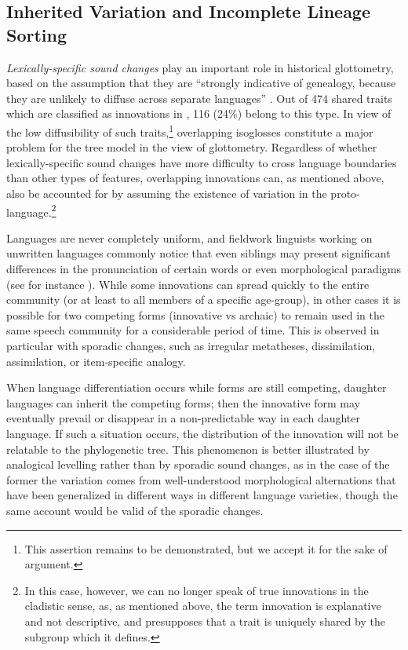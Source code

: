 \documentclass[svgnames,12pt]{scrartcl}
\begin{document}
{{\subsection{Inherited Variation and Incomplete Lineage Sorting}
\textit{Lexically-specific sound changes} play an important role in historical glottometry, based on
the assumption that
they are ``strongly indicative of genealogy, because they are unlikely to diffuse across separate
languages'' \citet[178]{Francois2015}. Out of 474 shared traits which are classified as innovations in \citet{Francois2015}, 116 (24\%) belong to this type. In view of the low
diffusibility of such traits,\footnote{This assertion remains to be demonstrated, but we
accept it for the sake of argument.} overlapping isoglosses constitute a major problem
for the tree model in the view of glottometry. Regardless of whether lexically-specific sound changes have more difficulty to
cross language boundaries than other types of features, overlapping innovations can, as mentioned
above, also be accounted for by assuming the existence of variation in the
proto-language.\footnote{In this case, however, we can no longer speak of true innovations in the cladistic
sense, as, as mentioned above, the term innovation is explanative and not descriptive, and
presupposes that a trait is uniquely shared by the subgroup which it defines.}

Languages are never completely uniform, and fieldwork linguists working on unwritten languages
commonly notice that even siblings may present significant differences in the pronunciation of
certain words or even morphological paradigms (see for instance \citealt[29-30]{genetti07grammar}).
While some innovations can spread quickly to the entire community (or at least to all members of a
specific age-group), in other cases it is possible for two competing forms (innovative vs archaic)
to remain used in the same  speech community for a considerable period of time. This is observed in
particular with sporadic changes, such as irregular metatheses, dissimilation, assimilation, or
item-specific analogy.

When language differentiation occurs while forms are still competing, daughter languages can inherit
the competing forms; then the innovative form may eventually prevail or disappear in a
non-predictable way in each daughter language. If such a situation occurs, the distribution of the
innovation will not be relatable to the phylogenetic tree.  This phenomenon is better illustrated by
analogical levelling rather than by sporadic sound changes, as in the case of the former the
variation comes from well-understood morphological alternations that have been generalized in
different ways in different language varieties, though the same account  would be valid of the
sporadic changes.
 
}}
\end{document}
